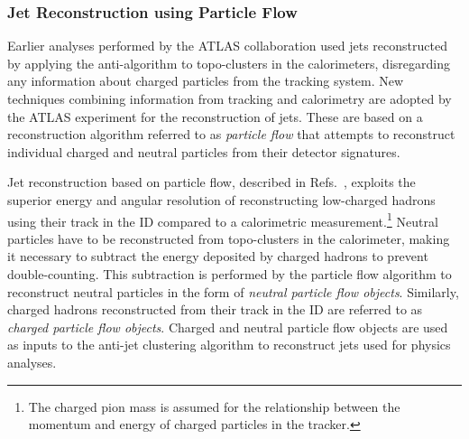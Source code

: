 \subsubsection{Jet Reconstruction using Particle Flow}


Earlier analyses performed by the ATLAS collaboration used jets reconstructed by
applying the anti-\kt algorithm to topo-clusters in the calorimeters,
disregarding any information about charged particles from the tracking
system. New techniques combining information from tracking and calorimetry are
adopted by the ATLAS experiment for the reconstruction of jets. These are based
on a reconstruction algorithm referred to as \emph{particle
  flow} that attempts to reconstruct individual
charged and neutral particles from their detector signatures.

Jet reconstruction based on particle flow, described in
Refs.~\cite{PERF-2015-09,JETM-2018-05}, exploits the superior energy and angular
resolution of reconstructing low-\pT charged hadrons using their track in the ID
compared to a calorimetric measurement.\footnote{The charged pion mass is
  assumed for the relationship between the momentum and energy of charged
  particles in the tracker.} Neutral particles have to be reconstructed from
topo-clusters in the calorimeter, making it necessary to subtract the energy
deposited by charged hadrons to prevent double-counting. This subtraction is
performed by the particle flow algorithm to reconstruct neutral particles in the
form of \emph{neutral particle flow objects}. Similarly, charged hadrons
reconstructed from their track in the ID are referred to as \emph{charged
  particle flow objects}.  Charged and neutral particle flow objects are used as
inputs to the anti-\kt jet clustering algorithm to reconstruct jets used for
physics analyses.

